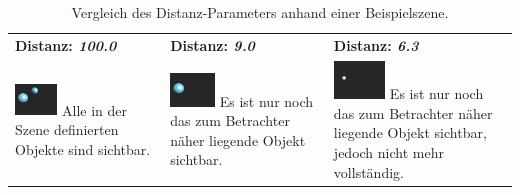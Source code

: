\begin{table}[H]\label{table:sphere_tracing_distance}
    \centering
    \caption{Vergleich des Distanz-Parameters anhand einer Beispielszene.}
    \begin{tabular}{p{}p{}p{}}
        \toprule
            \textbf{Distanz: \textit{100.0}} &
            \textbf{Distanz: \textit{9.0}}   &
            \textbf{Distanz: \textit{6.3}}   \\
        \cmidrule(r){1-1}\cmidrule(lr){2-2}\cmidrule(l){3-3}
            \includegraphics[width=0.3\textwidth]{img/sphere_tracing_distance_full.png}
            \newline
            Alle in der Szene definierten Objekte sind sichtbar. &
            \includegraphics[width=0.3\textwidth]{img/sphere_tracing_distance_less.png} \newline
            Es ist nur noch das zum Betrachter näher liegende Objekt sichtbar. &
            \includegraphics[width=0.3\textwidth]{img/sphere_tracing_distance_min.png} \newline
            Es ist nur noch das zum Betrachter näher liegende Objekt
            sichtbar, jedoch nicht mehr vollständig. \\
        \bottomrule
    \end{tabular}
\end{table}

